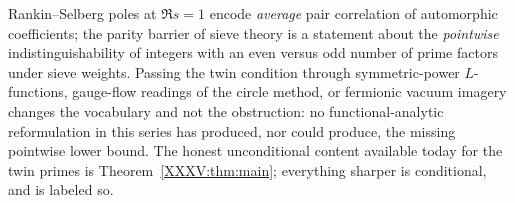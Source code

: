 \begin{remark}\label{XXXV:rem:metaphor}
Rankin--Selberg poles at $\Re s=1$ encode \emph{average} pair correlation of automorphic
coefficients; the parity barrier of sieve theory is a statement about the
\emph{pointwise} indistinguishability of integers with an even versus odd number of prime
factors under sieve weights. Passing the twin condition through symmetric-power
$L$-functions, gauge-flow readings of the circle method, or fermionic vacuum imagery
changes the vocabulary and not the obstruction: no functional-analytic reformulation in
this series has produced, nor could produce, the missing pointwise lower bound. The
honest unconditional content available today for the twin primes is
Theorem~\ref{XXXV:thm:main}; everything sharper is conditional, and is labeled so.
\end{remark}

